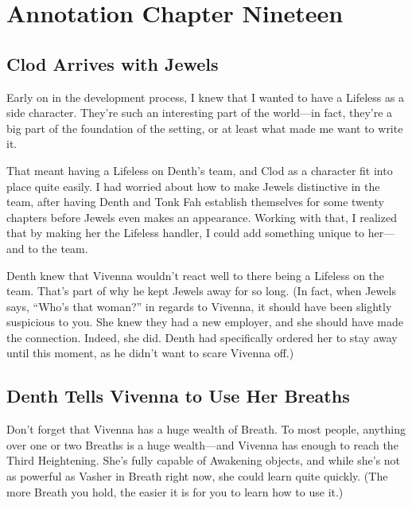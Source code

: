 \section{Annotation Chapter Nineteen}

\subsection*{Clod Arrives with Jewels}

Early on in the development process, I knew that I wanted to have a Lifeless as a side character. They’re such an interesting part of the world—in fact, they’re a big part of the foundation of the setting, or at least what made me want to write it.

That meant having a Lifeless on Denth’s team, and Clod as a character fit into place quite easily. I had worried about how to make Jewels distinctive in the team, after having Denth and Tonk Fah establish themselves for some twenty chapters before Jewels even makes an appearance. Working with that, I realized that by making her the Lifeless handler, I could add something unique to her—and to the team.

Denth knew that Vivenna wouldn’t react well to there being a Lifeless on the team. That’s part of why he kept Jewels away for so long. (In fact, when Jewels says, “Who’s that woman?” in regards to Vivenna, it should have been slightly suspicious to you. She knew they had a new employer, and she should have made the connection. Indeed, she did. Denth had specifically ordered her to stay away until this moment, as he didn’t want to scare Vivenna off.)

\subsection*{Denth Tells Vivenna to Use Her Breaths}

Don’t forget that Vivenna has a huge wealth of Breath. To most people, anything over one or two Breaths is a huge wealth—and Vivenna has enough to reach the Third Heightening. She’s fully capable of Awakening objects, and while she’s not as powerful as Vasher in Breath right now, she could learn quite quickly. (The more Breath you hold, the easier it is for you to learn how to use it.)



